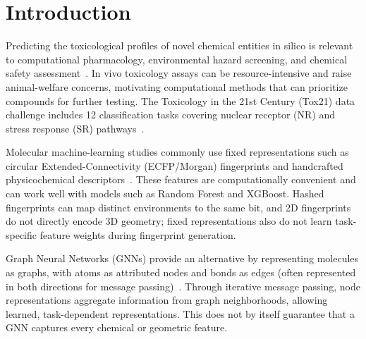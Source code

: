 \section{Introduction}
\label{sec:intro}

Predicting the toxicological profiles of novel chemical entities in silico is relevant to computational pharmacology, environmental hazard screening, and chemical safety assessment~\cite{huang2016tox21}. In vivo toxicology assays can be resource-intensive and raise animal-welfare concerns, motivating computational methods that can prioritize compounds for further testing. The Toxicology in the 21st Century (Tox21) data challenge includes 12 classification tasks covering nuclear receptor (NR) and stress response (SR) pathways~\cite{huang2016tox21}.

Molecular machine-learning studies commonly use fixed representations such as circular Extended-Connectivity (ECFP/Morgan) fingerprints and handcrafted physicochemical descriptors~\cite{wu2018moleculenet}. These features are computationally convenient and can work well with models such as Random Forest and XGBoost. Hashed fingerprints can map distinct environments to the same bit, and 2D fingerprints do not directly encode 3D geometry; fixed representations also do not learn task-specific feature weights during fingerprint generation.

Graph Neural Networks (GNNs) provide an alternative by representing molecules as graphs, with atoms as attributed nodes and bonds as edges (often represented in both directions for message passing)~\cite{duvenaud2015convolutional,gilmer2017neural}. Through iterative message passing, node representations aggregate information from graph neighborhoods, allowing learned, task-dependent representations. This does not by itself guarantee that a GNN captures every chemical or geometric feature.

